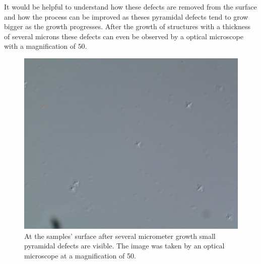 It would be helpful to understand how these defects are removed from the surface and how the process can be improved as theses pyramidal defects tend to grow bigger as the growth progresses. After the growth of structures with a thickness of several microns these defects can even be observed by a optical microscope with a magnification of $50$.
\begin{figure}[htb]
  \includegraphics[width=\linewidth]{Bilder/A2749_50_1}
  \caption{At the samples' surface after several micrometer growth small pyramidal defects are visible. The image was taken by an optical microscope at a magnification of 50.}
  \label{bandluecke}
\end{figure}



%
%	
%

